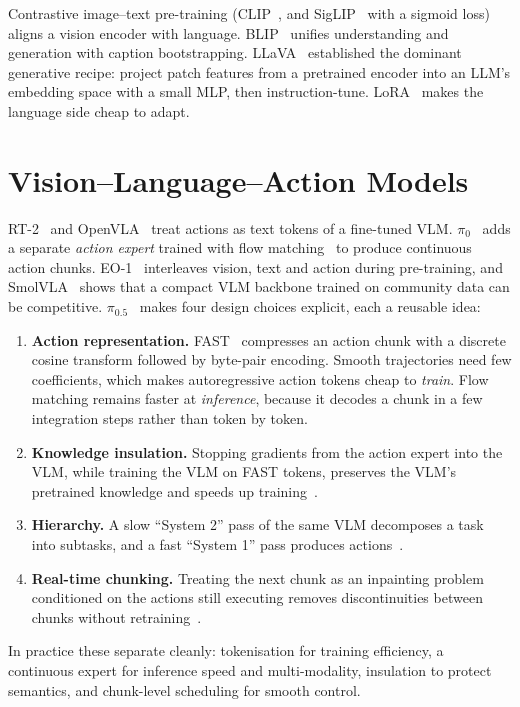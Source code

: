 \documentclass[11pt]{article}
\begin{document}
Contrastive image--text pre-training (CLIP~\cite{radford2021clip}, and SigLIP~\cite{zhai2023siglip}
with a sigmoid loss) aligns a vision encoder with language. BLIP~\cite{li2022blip} unifies
understanding and generation with caption bootstrapping. LLaVA~\cite{liu2023llava}
established the dominant generative recipe: project patch features from a pretrained
encoder into an LLM's embedding space with a small MLP, then instruction-tune. LoRA~\cite{hu2022lora}
makes the language side cheap to adapt.

\section{Vision--Language--Action Models}

RT-2~\cite{brohan2023rt2} and OpenVLA~\cite{kim2024openvla} treat actions as text tokens of a
fine-tuned VLM. $\pi_0$~\cite{black2024pi0} adds a separate \emph{action expert} trained with flow
matching~\cite{lipman2023flow} to produce continuous action chunks. EO-1~\cite{qu2025eo1}
interleaves vision, text and action during pre-training, and SmolVLA~\cite{shukor2025smolvla}
shows that a compact VLM backbone trained on community data can be competitive. $\pi_{0.5}$~\cite{pi05}
makes four design choices explicit, each a reusable idea:
\begin{enumerate}
  \item \textbf{Action representation.} FAST~\cite{pertsch2025fast} compresses an action chunk with
        a discrete cosine transform followed by byte-pair encoding. Smooth trajectories need
        few coefficients, which makes autoregressive action tokens cheap to \emph{train}. Flow
        matching remains faster at \emph{inference}, because it decodes a chunk in a few
        integration steps rather than token by token.
  \item \textbf{Knowledge insulation.} Stopping gradients from the action expert into the VLM,
        while training the VLM on FAST tokens, preserves the VLM's pretrained knowledge and
        speeds up training~\cite{driess2025ki}.
  \item \textbf{Hierarchy.} A slow ``System 2'' pass of the same VLM decomposes a task into
        subtasks, and a fast ``System 1'' pass produces actions~\cite{shi2025hirobot,pi05}.
  \item \textbf{Real-time chunking.} Treating the next chunk as an inpainting problem
        conditioned on the actions still executing removes discontinuities between chunks
        without retraining~\cite{black2025rtc}.
\end{enumerate}
In practice these separate cleanly: tokenisation for training efficiency, a continuous
expert for inference speed and multi-modality, insulation to protect semantics, and
chunk-level scheduling for smooth control.
\end{document}
